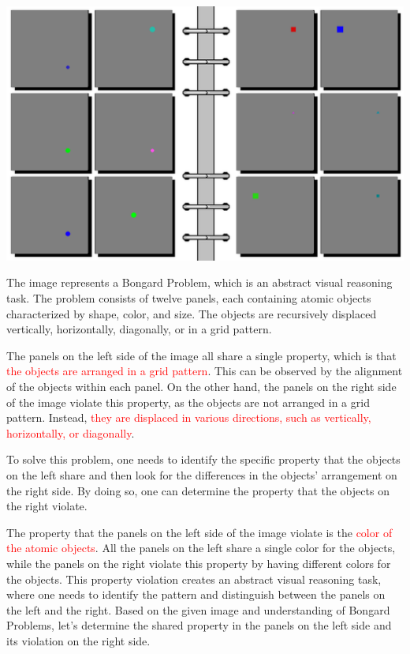 



\begin{tcolorbox}[breakable,enhanced jigsaw,opacityback=0,]
	\centering
	\includegraphics[width=.8\linewidth]{imgs/bongard/easy-2.png}\\
	\begin{dialogue}
		 The image represents a Bongard Problem, which is an abstract visual reasoning task. The problem consists of twelve panels, each containing atomic objects characterized by shape, color, and size. The objects are recursively displaced vertically, horizontally, diagonally, or in a grid pattern.
		
		The panels on the left side of the image all share a single property, which is that \textcolor{red}{the objects are arranged in a grid pattern}. This can be observed by the alignment of the objects within each panel. On the other hand, the panels on the right side of the image violate this property, as the objects are not arranged in a grid pattern. Instead, \textcolor{red}{they are displaced in various directions, such as vertically, horizontally, or diagonally}.
		
		To solve this problem, one needs to identify the specific property that the objects on the left share and then look for the differences in the objects' arrangement on the right side. By doing so, one can determine the property that the objects on the right violate.
		
		\vspace{1em}
		 The property that the panels on the left side of the image violate is the \textcolor{red}{color of the atomic objects}. All the panels on the left share a single color for the objects, while the panels on the right violate this property by having different colors for the objects. This property violation creates an abstract visual reasoning task, where one needs to identify the pattern and distinguish between the panels on the left and the right.
		\vspace{1em}
		 Based on the given image and understanding of Bongard Problems, let's determine the shared property in the panels on the left side and its violation on the right side.
		

\end{dialogue}
\end{tcolorbox}

